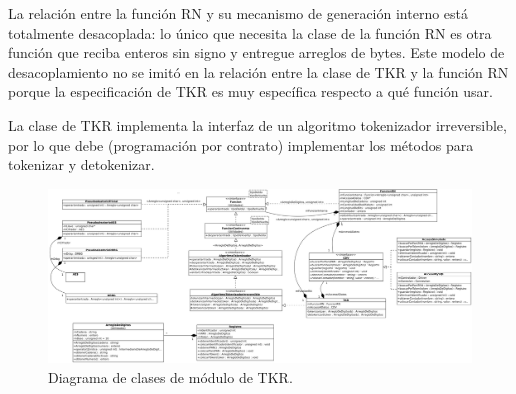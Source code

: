 La relación entre la función RN y su mecanismo de generación interno está
totalmente desacoplada: lo único que necesita la clase de la función RN es otra
función que reciba enteros sin signo y entregue arreglos de bytes. Este modelo
de desacoplamiento no se imitó en la relación entre la clase de TKR y la función
RN porque la especificación de TKR es muy específica respecto a qué función
usar.

La clase de TKR implementa la interfaz de un algoritmo tokenizador irreversible,
por lo que debe (programación por contrato) implementar los métodos para
tokenizar y detokenizar.

\begin{figure}
  \begin{center}
    \includegraphics[width=1.0\linewidth]{diagramas/tkr.png}
    \caption{Diagrama de clases de módulo de TKR.}
    \label{clases_tkr}
  \end{center}
\end{figure}
